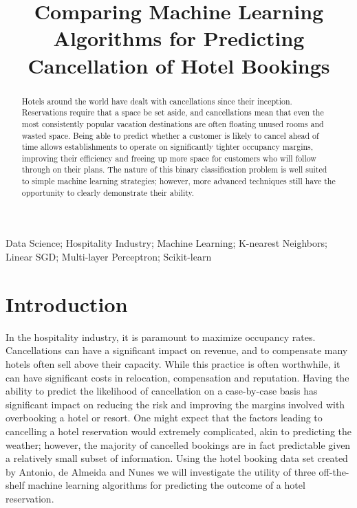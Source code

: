 \documentclass[10pt,conference]{IEEEtran}
\begin{document}
\title{Comparing Machine Learning Algorithms for Predicting Cancellation of Hotel Bookings\\}

\author{
}

\maketitle

\begin{abstract}
 Hotels around the world have dealt with cancellations since their inception. Reservations require that a space be set aside, and cancellations mean that even the most consistently popular vacation destinations are often floating unused rooms and wasted space. Being able to predict whether a customer is likely to cancel ahead of time allows establishments to operate on significantly tighter occupancy margins, improving their efficiency and freeing up more space for customers who will follow through on their plans. The nature of this binary classification problem is well suited to simple machine learning strategies; however, more advanced techniques still have the opportunity to clearly demonstrate their ability.
\end{abstract}

\begin{IEEEkeywords}
  Data Science; Hospitality Industry; Machine Learning; K-nearest Neighbors; Linear SGD; Multi-layer Perceptron; Scikit-learn
\end{IEEEkeywords}


\section{Introduction}
  In the hospitality industry, it is paramount to maximize occupancy rates. Cancellations can have a significant impact on revenue, and to compensate many hotels often sell above their capacity\cite{mehrotra_ruttley_2006}. While this practice is often worthwhile, it can have significant costs in relocation, compensation and reputation. Having the ability to predict the likelihood of cancellation on a case-by-case basis has significant impact on reducing the risk and improving the margins involved with overbooking a hotel or resort\cite{morales2010}. One might expect that the factors leading to cancelling a hotel reservation would extremely complicated, akin to predicting the weather; however, the majority of cancelled bookings are in fact predictable given a relatively small subset of information. Using the hotel booking data set created by Antonio, de Almeida and Nunes\cite{Antonio2019} we will investigate the utility of three off-the-shelf machine learning algorithms for predicting the outcome of a hotel reservation.
\end{document}
